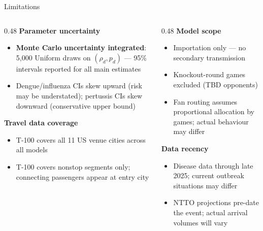 \documentclass[aspectratio=169, 11pt]{beamer}
\begin{document}
\begin{frame}{Limitations}
  \small
  \begin{columns}[T]
    \begin{column}{0.48\textwidth}
      \textbf{Parameter uncertainty}
      \begin{itemize}
        \item \textbf{Monte Carlo uncertainty integrated}: 5,000
              Uniform draws on $(\rho_d, p_d)$ — 95\% intervals
              reported for all main estimates
        \item Dengue/influenza CIs skew upward (risk may be
              understated); pertussis CIs skew downward (conservative
              upper bound)
      \end{itemize}
      \vspace{2pt}
      \textbf{Travel data coverage}
      \begin{itemize}
        \item T-100 covers all 11 US venue cities across all models
        \item T-100 covers nonstop segments only; connecting
              passengers appear at entry city
      \end{itemize}
    \end{column}
    \begin{column}{0.48\textwidth}
      \textbf{Model scope}
      \begin{itemize}
        \item Importation only — no secondary transmission
        \item Knockout-round games excluded (TBD opponents)
        \item Fan routing assumes proportional allocation by
              games; actual behaviour may differ
      \end{itemize}
      \vspace{2pt}
      \textbf{Data recency}
      \begin{itemize}
        \item Disease data through late 2025; current outbreak
              situations may differ
        \item NTTO projections pre-date the event; actual
              arrival volumes will vary
      \end{itemize}
    \end{column}
  \end{columns}
\end{frame}
\end{document}
